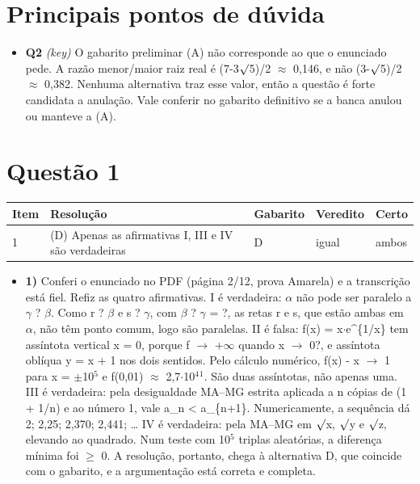 \documentclass{article}%
\begin{document}
\section*{Principais pontos de dúvida}%
\begin{itemize}%
\item%
\textbf{Q2} \textit{(key)} O gabarito preliminar (A) não corresponde ao que o enunciado pede. A razão menor/maior raiz real é (7-3$\surd$5)/2 $\approx$ 0,146, e não (3-$\surd$5)/2 $\approx$ 0,382. Nenhuma alternativa traz esse valor, então a questão é forte candidata a anulação. Vale conferir no gabarito definitivo se a banca anulou ou manteve a (A).%
\end{itemize}%
\section*{Questão 1}%
\begin{longtable}{@{}p{} p{} p{} p{} p{}@{}}\toprule Item & Resolução & Gabarito & Veredito & Certo \\ \midrule
1 & (D) Apenas as afirmativas I, III e IV são verdadeiras & D & igual & ambos \\
\bottomrule\end{longtable}%
\begin{itemize}%
\item%
\textbf{1)} Conferi o enunciado no PDF (página 2/12, prova Amarela) e a transcrição está fiel. Refiz as quatro afirmativas. I é verdadeira: $\alpha$ não pode ser paralelo a $\gamma$ ? $\beta$. Como r ? $\beta$ e s ? $\gamma$, com $\beta$ ? $\gamma$ = ?, as retas r e s, que estão ambas em $\alpha$, não têm ponto comum, logo são paralelas. II é falsa: f(x) = x$\cdot$e\^{}\{1/x\} tem assíntota vertical x = 0, porque f $\to$ +$\infty$ quando x $\to$ 0?, e assíntota oblíqua y = x + 1 nos dois sentidos. Pelo cálculo numérico, f(x) - x $\to$ 1 para x = $\pm$10$^{5}$ e f(0,01) $\approx$ 2,7$\cdot$10$^{4}$$^{1}$. São duas assíntotas, não apenas uma. III é verdadeira: pela desigualdade MA--MG estrita aplicada a n cópias de (1 + 1/n) e ao número 1, vale a\_n < a\_\{n+1\}. Numericamente, a sequência dá 2; 2,25; 2,370; 2,441; \ldots{} IV é verdadeira: pela MA--MG em $\surd$x, $\surd$y e $\surd$z, elevando ao quadrado. Num teste com 10$^{5}$ triplas aleatórias, a diferença mínima foi $\geq$ 0. A resolução, portanto, chega à alternativa D, que coincide com o gabarito, e a argumentação está correta e completa.%
\end{itemize}%
\end{document}

